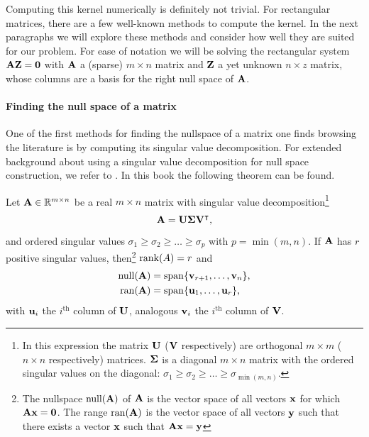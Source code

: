 Computing this kernel numerically is definitely not trivial. For rectangular matrices, there are a few well-known methods to compute the kernel. In the next paragraphs we will explore these methods and consider how well they are suited for our problem. For ease of notation we will be solving the rectangular system $\vb{A} \vb{Z} = \vb{0}$ with $\vb{A}$ a (sparse) $m\times n$ matrix and $\vb{Z}$ a yet unknown $n \times z$ matrix, whose columns are a basis for the right null space of $\vb{A}$.

\paragraph{Finding the null space of a matrix}
One of the first methods for finding the nullspace of a matrix one finds browsing the literature is by computing its singular value decomposition. For extended background about using a singular value decomposition for null space construction, we refer to \cite[section~2.4]{golub_matrix_2013}. In this book the following theorem can be found.

\begin{theorem}
    Let $\vb{A} \in \mathbb{R}^{m \times n}$ be a real $m \times n$ matrix with singular value decomposition\footnote{In this expression the matrix $\vb{U}$ ($\vb{V}$ respectively) are orthogonal $m \times m$ ($n \times n$ respectively) matrices. $\vb{\Sigma}$ is a diagonal $m \times n$ matrix with the ordered singular values on the diagonal: $\sigma_1 \geq \sigma_2 \geq \dots \geq \sigma_{\min(m, n)}$. }
    $$
        \vb{A} = \vb{U}\vb{\Sigma}{\vb{V}}^\intercal\text{,}
    $$
    and ordered singular values $\sigma_1 \geq \sigma_2 \geq \dots \geq \sigma_p$ with $p = \min(m, n)$.
    If $\vb{A}$ has $r$ positive singular values, then\footnote{The nullspace $\operatorname{null}(\vb{A})$ of $\vb{A}$ is the vector space of all vectors $\vb{x}$ for which $\vb{A} \vb{x} = \vb{0}$. The range $\operatorname{ran}(\vb{A})$ is the vector space of all vectors $\vb{y}$ such that there exists a vector $\vb{x}$ such that $\vb{A}\vb{x} = \vb{y}$} $\operatorname{rank}(A) = r$ and
    \begin{align*}
        \operatorname{null}(\vb{A}) & = \operatorname{span}\{\vb{v}_{r+1}, \dots, \vb{v}_{n}\}\text{,} \\
        \operatorname{ran}(\vb{A})  & = \operatorname{span}\{\vb{u}_{1}, \dots, \vb{u}_{r}\}\text{,}
    \end{align*}
    with $\vb{u}_i$ the $i^\text{th}$ column of $\vb{U}$, analogous $\vb{v}_i$ the $i^\text{th}$ column of $\vb{V}$.
\end{theorem}

